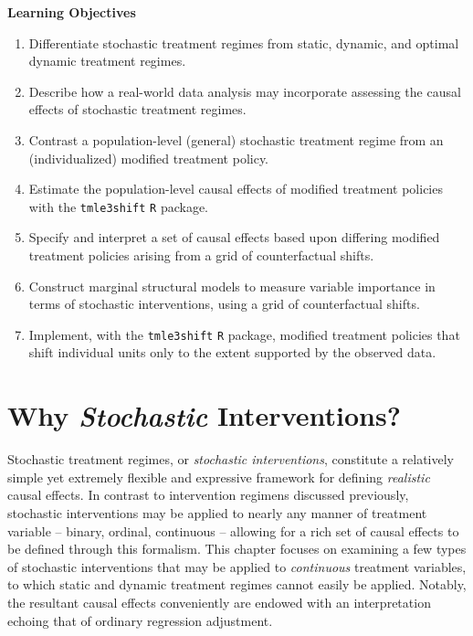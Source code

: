\documentclass[
  12pt, krantz2,
]{krantz}
\newcommand{\passthrough}[1]{#1}
\providecommand{\tightlist}{%
  \setlength{\itemsep}{0pt}\setlength{\parskip}{0pt}}
\newcommand{\1}{\mathbbm{1}}
\newenvironment{infobox}{
  \definecolor{shadecolor}{rgb}{0.0, 1.0, 1.0}
  \color{black}
  \begin{shaded}
    }{
  \end{shaded}
}
\theoremstyle{definition}
\theoremstyle{definition}
\theoremstyle{definition}
\theoremstyle{definition}
\theoremstyle{remark}
\begin{document}
\begin{infobox}

\begin{center}
\textbf{Learning Objectives}

\end{center}

\begin{enumerate}
\def\labelenumi{\arabic{enumi}.}
\tightlist
\item
  Differentiate stochastic treatment regimes from static, dynamic, and optimal
  dynamic treatment regimes.
\item
  Describe how a real-world data analysis may incorporate assessing the causal
  effects of stochastic treatment regimes.
\item
  Contrast a population-level (general) stochastic treatment regime from an
  (individualized) modified treatment policy.
\item
  Estimate the population-level causal effects of modified treatment policies
  with the \passthrough{\lstinline!tmle3shift!} \passthrough{\lstinline!R!} package.
\item
  Specify and interpret a set of causal effects based upon differing modified
  treatment policies arising from a grid of counterfactual shifts.
\item
  Construct marginal structural models to measure variable importance in terms
  of stochastic interventions, using a grid of counterfactual shifts.
\item
  Implement, with the \passthrough{\lstinline!tmle3shift!} \passthrough{\lstinline!R!} package, modified treatment policies
  that shift individual units only to the extent supported by the observed
  data.
\end{enumerate}

\end{infobox}

\hypertarget{why-stochastic-interventions}{%
\section{\texorpdfstring{Why \emph{Stochastic} Interventions?}{Why Stochastic Interventions?}}\label{why-stochastic-interventions}}

Stochastic treatment regimes, or \emph{stochastic interventions}, constitute a
relatively simple yet extremely flexible and expressive framework for defining
\emph{realistic} causal effects. In contrast to intervention regimens discussed
previously, stochastic interventions may be applied to nearly any manner of
treatment variable -- binary, ordinal, continuous -- allowing for a rich set of
causal effects to be defined through this formalism. This chapter focuses on
examining a few types of stochastic interventions that may be applied to
\emph{continuous} treatment variables, to which static and dynamic treatment regimes
cannot easily be applied. Notably, the resultant causal effects conveniently are
endowed with an interpretation echoing that of ordinary regression adjustment.
\end{document}
